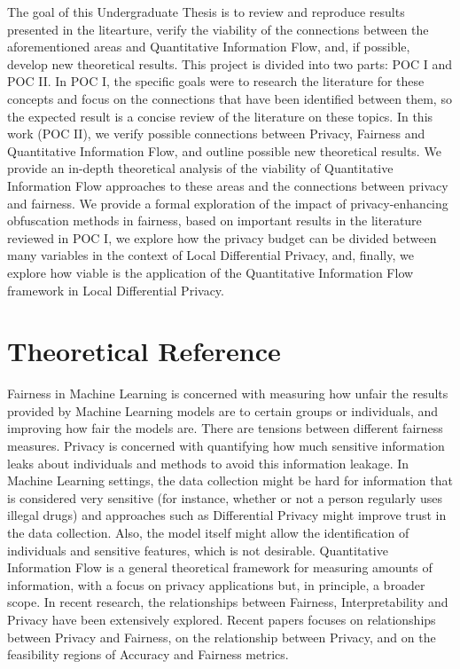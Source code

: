 \documentclass[conference]{IEEEtran}
\begin{document}
The goal of this Undergraduate Thesis is to review and reproduce results presented in the litearture, verify the viability of the connections between the aforementioned areas and Quantitative Information Flow, and, if possible, develop new theoretical results. This project is divided into two parts: POC I and POC II. In POC I, the specific goals were to research the literature for these concepts and focus on the connections that have been identified between them, so the expected result is a concise review of the literature on these topics. In this work (POC II), we verify possible connections between Privacy, Fairness and Quantitative Information Flow, and outline possible new theoretical results. We provide an in-depth theoretical analysis of the viability of Quantitative Information Flow approaches to these areas and the connections between privacy and fairness. We provide a formal exploration of the impact of privacy-enhancing obfuscation methods in fairness, based on important results in the literature reviewed in POC I, we explore how the privacy budget can be divided between many variables in the context of Local Differential Privacy, and, finally, we explore how viable is the application of the Quantitative Information Flow framework in Local Differential Privacy.

\section{Theoretical Reference}

Fairness in Machine Learning is concerned with measuring how unfair the results provided by Machine Learning models are to certain groups or individuals\cite{FairMeasures}, and improving how fair the models are\cite{FairSolve}. There are tensions between different fairness measures\cite{Impossibility}\cite{FairTensions}. Privacy is concerned with quantifying how much sensitive information leaks about individuals and methods to avoid this information leakage. In Machine Learning settings, the data collection might be hard for information that is considered very sensitive (for instance, whether or not a person regularly uses illegal drugs) and approaches such as Differential Privacy\cite{DP} might improve trust in the data collection. Also, the model itself might allow the identification of individuals and sensitive features, which is not desirable\cite{liu2021machine}. Quantitative Information Flow is a general theoretical framework for measuring amounts of information, with a focus on privacy applications but, in principle, a broader scope\cite{QIF}. In recent research\cite{Sok}, the relationships between Fairness, Interpretability and Privacy have been extensively explored. Recent papers focuses on relationships between Privacy and Fairness\cite{Awareness}, on the relationship between Privacy\cite{Rachel}, and on the feasibility regions of Accuracy and Fairness metrics\cite{Carlos}\cite{Reductions}. 
\end{document}
